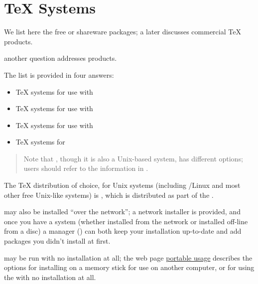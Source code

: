 
\section{\TeX{} Systems}


We list here the free or shareware packages;
\htmlignore
a later  discusses commercial \TeX{} products.
\endhtmlignore
\begin{htmlversion}
  another question addresses
   products.
\end{htmlversion}

The list is provided in four answers:
\begin{itemize}
\item \TeX{} systems for use with
\item \TeX{} systems for use with %
\item \TeX{} systems for use with %
\item \TeX{} systems for %
\end{itemize}


\begin{quote}
  Note that \macosx{}, though it is also a Unix-based system, has
  different options; users should refer to the information in
  .
\end{quote}

The \TeX{} distribution of choice, for Unix systems (including
/Linux and most other free Unix-like systems) is \texlive{},
which is distributed as part of the .

\texlive{} may also be installed ``over the network''; a network
installer is provided, and once you have a system (whether installed
from the network or installed off-line from a disc) a manager
() can both keep your installation up-to-date and add
packages you didn't install at first.

\texlive{} may be run with no installation at all; the web page %
\href{http://www.tug.org/texlive/portable.html}{\texlive{} portable usage}
describes the options for installing \texlive{} on a memory stick for
use on another computer, or for using the \texlive{}  with
no installation at all.


